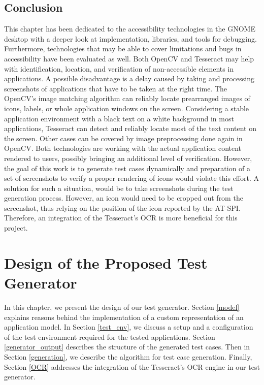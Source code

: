 \section{Conclusion}\label{ocr_conclusion}
This chapter has been dedicated to the accessibility technologies in the GNOME desktop with a deeper look at implementation, libraries, and tools for debugging. Furthermore, technologies that may be able to cover limitations and bugs in accessibility have been evaluated as well. Both OpenCV and Tesseract may help with identification, location, and verification of non-accessible elements in applications. A possible disadvantage is a delay caused by taking and processing screenshots of applications that have to be taken at the right time. The OpenCV's image matching algorithm can reliably locate prearranged images of icons, labels, or whole application windows on the screen. Considering a stable application environment with a black text on a white background in most applications, Tesseract can detect and reliably locate most of the text content on the screen. Other cases can be covered by image preprocessing done again in OpenCV. Both technologies are working with the actual application content rendered to users, possibly bringing an additional level of verification. However, the goal of this work is to generate test cases dynamically and preparation of a set of screenshots to verify a proper rendering of icons would violate this effort. A solution for such a situation, would be to take screenshots during the test generation process. However, an icon would need to be cropped out from the screenshot, thus relying on the position of the icon reported by the AT-SPI. Therefore, an integration of the Tesseract's OCR is more beneficial for this project.

\chapter{Design of the Proposed Test Generator}\label{proposed_solution}
In this chapter, we present the design of our test generator. Section \ref{model} explains reasons behind the implementation of a custom representation of an application model. In Section \ref{test_env}, we discuss a setup and a configuration of the test environment required for the tested applications. Section \ref{generator_output} describes the structure of the generated test cases. Then in Section \ref{generation}, we describe the algorithm for test case generation. Finally, Section \ref{OCR} addresses the integration of the Tesseract's OCR engine in our test generator.

